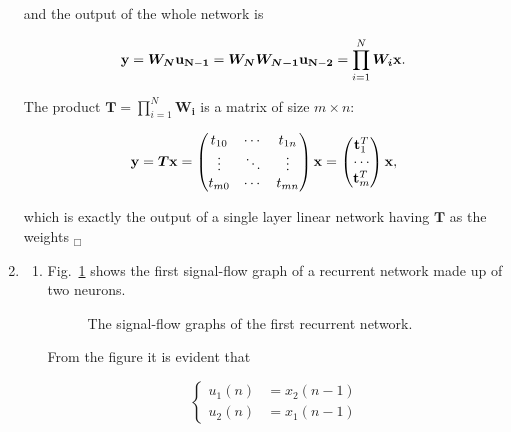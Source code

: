 \documentclass[10pt,a4]{article}
\newcommand{\vect}[1]{{\bf{#1}}}
\newcommand{\matr}[1]{\boldsymbol{#1}}
\begin{document}
\begin{enumerate}
  \begin{center}
    
  \end{center}
  
  and the output of the whole network is

  \begin{equation}
    \vect{y} = \matr{W_N} \vect{u_{N-1}} = \matr{W_N}  \matr{W_{N-1}}
    \vect{u_{N-2}} = \prod_{i = 1}^{N} \matr{W_i} \vect{x}.
  \end{equation}

  The product $\matr{T} = \prod_{i = 1}^{N} \matr{W_i}$ is a matrix of
  size $m \times n$: 

 \begin{equation}
    \vect{y} = \matr{T} \vect{x} = 
    \begin{pmatrix}
      t_{10} & \cdots & t_{1n} \\ \vdots & \ddots & \vdots \\
      t_{m0} & \cdots & t_{mn} 
    \end{pmatrix} \vect{x} = 
    \begin{pmatrix}  \vect{t}_1^T\\ \cdots \\
      \vect{t}_m^T 
    \end{pmatrix} \vect{x},
  \end{equation}
  
  which is exactly the output of a single layer linear network having
  $\matr{T}$ as the weights $_\Box$

\item 
\begin{enumerate} \item Fig.~\ref{fig:ex4a} shows the first
  signal-flow graph of a recurrent network made up of two neurons.

\begin{figure}[h] 
  \centering
      
      \caption{The signal-flow graphs of the first recurrent network.}
  \label{fig:ex4a}
\end{figure}

From the figure it is evident that

\begin{equation}
  \left\{ \begin{aligned} u_1(n) & = x_2(n-1) \\  u_2(n) & = x_1(n-1)
    \end{aligned} \right. 
\end{equation}


\end{enumerate}
\end{enumerate}
\end{document}
